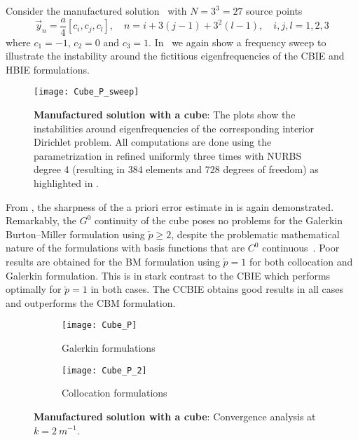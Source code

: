Consider the manufactured solution~ with $N=3^3=27$ source points 
\begin{equation*}
	\vec{y}_n = \frac{a}{4}[c_i, c_j, c_l],\quad n=i+3(j-1)+3^2(l-1),\quad i,j,l=1,2,3
\end{equation*}
where $c_1=-1$, $c_2=0$ and $c_3=1$. In~ we again show a frequency sweep to illustrate the instability around the fictitious eigenfrequencies of the CBIE and HBIE formulations.
\begin{figure}
	\centering
	\texttt{[image: Cube\_P\_sweep]}
	\caption{\textbf{Manufactured solution with a cube}: The plots show the instabilities around eigenfrequencies of the corresponding interior Dirichlet problem. All computations are done using the parametrization in  refined uniformly three times with NURBS degree 4 (resulting in 384 elements and 728 degrees of freedom) as highlighted in .}
	\label{Fig3:Cube_P_sweep}
\end{figure}
From , the sharpness of the a priori error estimate in  is again demonstrated. Remarkably, the $G^0$ continuity of the cube poses no problems for the Galerkin Burton--Miller formulation using $\check{p}\geq 2$, despite the problematic mathematical nature of the formulations with basis functions that are $C^0$ continuous~\cite{Liu1999anf}. Poor results are obtained for the BM formulation using $\check{p}=1$ for both collocation and Galerkin formulation. This is in stark contrast to the CBIE which performs optimally for $\check{p}=1$ in both cases. The CCBIE obtains good results in all cases and outperforms the CBM formulation.
\begin{figure}
	\centering
	\begin{subfigure}[t]{\textwidth}
		\texttt{[image: Cube\_P]}
		\caption{Galerkin formulations}
		\label{Fig3:Cube_P1}
	\end{subfigure} 
	\par\bigskip
	\par\bigskip
	\begin{subfigure}[t]{\textwidth}
		\texttt{[image: Cube\_P\_2]}
		\caption{Collocation formulations}
		\label{Fig3:Cube_P2}
	\end{subfigure} 
	\caption{\textbf{Manufactured solution with a cube}: Convergence analysis at $k=\SI{2}{m^{-1}}$.}
	\label{Fig3:Cube_P}
\end{figure}


